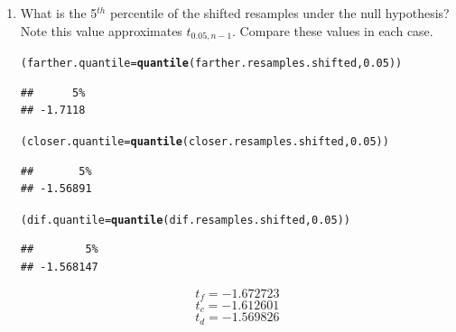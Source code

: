 \documentclass{article}\usepackage[]{graphicx}\usepackage[]{xcolor}
\makeatletter
\newcommand{\hlnum}[1]{\textcolor[rgb]{0.686,0.059,0.569}{#1}}%
\newcommand{\hldef}[1]{\textcolor[rgb]{0.345,0.345,0.345}{#1}}%
\newcommand{\hlkwb}[1]{\textcolor[rgb]{0.69,0.353,0.396}{#1}}%
\newcommand{\hlkwd}[1]{\textcolor[rgb]{0.737,0.353,0.396}{\textbf{#1}}}%
\newenvironment{kframe}{%
 \def\at@end@of@kframe{}%
 \ifinner\ifhmode%
  \def\at@end@of@kframe{\end{minipage}}%
  \begin{minipage}{\columnwidth}%
 \fi\fi%
 \def\FrameCommand##1{\hskip\@totalleftmargin \hskip-\fboxsep
 \colorbox{shadecolor}{##1}\hskip-\fboxsep
     \hskip-\linewidth \hskip-\@totalleftmargin \hskip\columnwidth}%
 \MakeFramed {\advance\hsize-\width
   \@totalleftmargin\z@ \linewidth\hsize
   \@setminipage}}%
 {\par\unskip\endMakeFramed%
 \at@end@of@kframe}
\newenvironment{knitrout}{}{} %
\makeatother
\begin{document}
\begin{enumerate}
\begin{enumerate}
    \item What is the 5$^{th}$ percentile of the shifted resamples under the null hypothesis? 
  Note this value approximates $t_{0.05, n-1}$. Compare these values in each case.
\begin{knitrout}\scriptsize
{}\color{fgcolor}\begin{kframe}
\begin{alltt}
\hldef{(farther.quantile} \hlkwb{=} \hlkwd{quantile}\hldef{(farther.resamples.shifted,} \hlnum{0.05}\hldef{))}
\end{alltt}
\begin{verbatim}
##      5% 
## -1.7118
\end{verbatim}
\begin{alltt}
\hldef{(closer.quantile} \hlkwb{=} \hlkwd{quantile}\hldef{(closer.resamples.shifted,} \hlnum{0.05}\hldef{))}
\end{alltt}
\begin{verbatim}
##       5% 
## -1.56891
\end{verbatim}
\begin{alltt}
\hldef{(dif.quantile} \hlkwb{=} \hlkwd{quantile}\hldef{(dif.resamples.shifted,} \hlnum{0.05}\hldef{))}
\end{alltt}
\begin{verbatim}
##        5% 
## -1.568147
\end{verbatim}
\end{kframe}
\end{knitrout}
\[t_f = -1.672723\]
\[t_c = -1.612601\]
\[t_d = -1.569826\]


\end{enumerate}
\end{enumerate}
\end{document}
